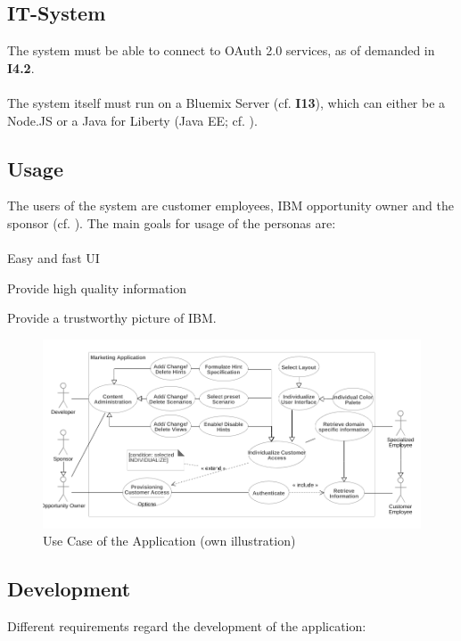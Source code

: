 \subsection{IT-System}
The system must be able to connect to OAuth 2.0 services, as of demanded in \textbf{I4.2}.

\paragraph{} The system itself must run on a Bluemix Server (cf. \textbf{I13}), which can either be a Node.JS or a Java for Liberty (Java EE; cf. \cite{}). 

\subsection{Usage}
The users of the system are customer employees, IBM opportunity owner and the sponsor (cf. \cpageref{}). The main goals for usage of the personas are: 
\paragraph{}
\begin{closeItemCol}
    \item Easy and fast UI
    \item Provide high quality information
    \item Provide a trustworthy picture of IBM.
\end{closeItemCol}


\begin{figure}[H]
    \centering
    \includegraphics[width=\textwidth]{img/diagrams/Use Case.png}
    \caption[Use Case of the Application]{Use Case of the Application (own illustration)}
    \label{fig:}
\end{figure}


\subsection{Development}
Different requirements regard the development of the application: 
